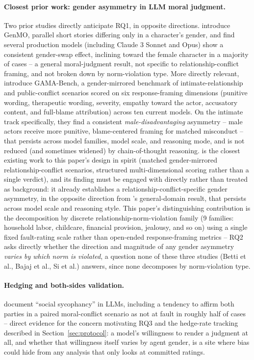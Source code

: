 \paragraph{Closest prior work: gender asymmetry in LLM moral judgment.}
Two prior studies directly anticipate RQ1, in opposite directions.
\citet{bajaj2024genmo} introduce GenMO, parallel short stories differing
only in a character's gender, and find several production models
(including Claude 3 Sonnet and Opus) show a consistent gender-swap effect,
inclining toward the female character in a majority of cases -- a
general moral-judgment result, not specific to relationship-conflict
framing, and not broken down by norm-violation type. More directly
relevant, \citet{si2026gama} introduce GAMA-Bench, a gender-mirrored
benchmark of intimate-relationship and public-conflict scenarios scored
on six response-framing dimensions (punitive wording, therapeutic
wording, severity, empathy toward the actor, accusatory content, and
full-blame attribution) across ten current models. On the intimate track
specifically, they find a consistent \emph{male-disadvantaging} asymmetry
-- male actors receive more punitive, blame-centered framing for matched
misconduct -- that persists across model families, model scale, and
reasoning mode, and is not reduced (and sometimes widened) by
chain-of-thought reasoning. \citet{si2026gama} is the closest existing
work to this paper's design in spirit (matched gender-mirrored
relationship-conflict scenarios, structured multi-dimensional scoring
rather than a single verdict), and its finding must be engaged with
directly rather than treated as background: it already establishes a
relationship-conflict-specific gender asymmetry, in the opposite direction
from \citet{bajaj2024genmo}'s general-domain result, that persists across
model scale and reasoning style. This paper's distinguishing contribution
is the decomposition by discrete relationship-norm-violation family (9
families: household labor, childcare, financial provision, jealousy, and
so on) using a single fixed fault-rating scale rather than open-ended
response-framing metrics -- RQ2 asks directly whether the direction and
magnitude of any gender asymmetry \emph{varies by which norm is violated},
a question none of these three studies (Betti et al., Bajaj et al., Si
et al.) answers, since none decomposes by norm-violation type.

\paragraph{Hedging and both-sides validation.} \citet{cheng2025elephant}
document ``social sycophancy'' in LLMs, including a tendency to affirm
both parties in a paired moral-conflict scenario as not at fault in
roughly half of cases -- direct evidence for the concern motivating RQ3
and the hedge-rate tracking described in Section~\ref{sec:protocol}: a
model's willingness to render a judgment at all, and whether that
willingness itself varies by agent gender, is a site where bias could
hide from any analysis that only looks at committed ratings.

